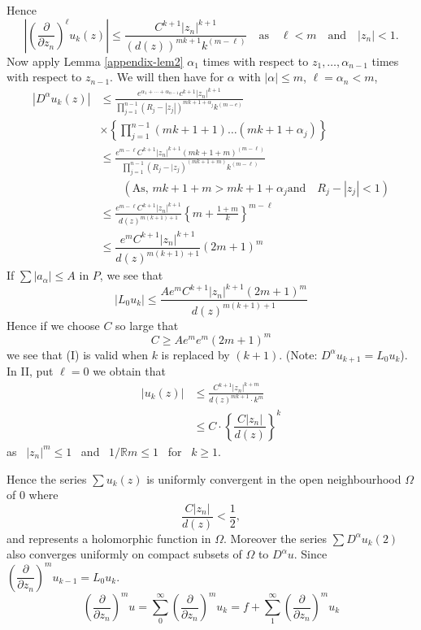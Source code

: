 Hence
$$
\left| \left(\dfrac{\partial}{\partial z_{n}}\right)^{\ell}u_{k}(z)\right|\leq \dfrac{C^{k+1}|z_{n}|^{k+1}}{(d(z))^{mk+1}k^{(m-\ell)}}\quad\text{as}\quad \ell<m\quad\text{and}\quad |z_{n}|<1.
$$
Now apply Lemma \ref{appendix-lem2} $\alpha_{1}$ times with respect to $z_{1},\ldots,\alpha_{n-1}$ times with respect to $z_{n-1}$. We will then have for $\alpha$ with $|\alpha|\leq m$, $\ell=\alpha_{n}<m$,
\begin{align*}
|D^{\alpha}u_{k}(z)| &\leq \frac{e^{\alpha_{1}+\cdots+\alpha_{n-1}}c^{k+1}|z_{n}|^{k+1}}{\prod\limits^{n-1}_{j=1}(R_{j}-|z_{j}|)^{mk+1+\alpha_{j}}k^{(m-e)}}\\[4pt]
&\times \left\{\prod\limits^{n-1}_{j=1}(mk+1+1)\ldots (mk+1+\alpha_{j})\right\}\\[4pt]
&\leq \frac{e^{m-\ell}C^{k+1}|z_{n}|^{k+1}(mk+1+m)^{(m-\ell)}}{\prod\limits^{n-1}_{j=1}(R_{j}-|z_{j})^{(mk+1+m)}k^{(m-\ell)}}\\[2pt]
&\qquad (\text{As, } mk+1+m>mk+1+\alpha_{j} \text{and~~ } R_{j}-|z_{j}|<1)\\[4pt]
&\leq \frac{e^{m-\ell}C^{k+1}|z_{n}|^{k+1}}{d(z)^{m(k+1)+1}}\left\{m+\frac{1+m}{k}\right\}^{m-\ell}\\[3pt]
&\leq \dfrac{e^{m}C^{k+1}|z_{n}|^{k+1}}{d(z)^{m(k+1)+1}}(2m+1)^{m}
\end{align*}\pageoriginale
If $\sum |a_{\alpha}|\leq A$ in $P$, we see that
$$
|L_{0}u_{k}|\leq \frac{Ae^{m}C^{k+1}|z_{n}|^{k+1}(2m+1)^{m}}{d(z)^{m(k+1)+1}}
$$
Hence if we choose $C$ so large that
$$
C\geq Ae^{m}e^{m}(2m+1)^{m}
$$
we see that (I) is valid when $k$ is replaced by $(k+1)$. (Note: $D^{\alpha}u_{k+1}=L_{0}u_{k}$). In II, put $\ell=0$ we obtain that
\begin{align*}
|u_{k}(z)| &\leq \frac{C^{k+1}|z_{n}|^{k+m}}{d(z)^{mk+1}\cdot k^{m}}\\[4pt]
&\leq C\cdot \left\{\dfrac{C|z_{n}|}{d(z)}\right\}^{k}
\end{align*}
as \ $|z_{n}|^{m}\leq 1$ \ and \ $1/\mathbb{R} m \leq 1$ \ for \ $k\geq 1$.

Hence the series $\sum u_{k}(z)$ is uniformly convergent in the open neighbourhood $\Omega$ of $0$ where
$$
\dfrac{C|z_{n}|}{d(z)}<\frac{1}{2},
$$
and represents a holomorphic function in $\Omega$. Moreover the series $\sum D^{\alpha}u_{k}(2)$ also converges uniformly on compact subsets of $\Omega$ to $D^{\alpha}u$. Since $\left(\dfrac{\partial}{\partial z_{n}}\right)^{m}u_{k-1}=L_{0}u_{k}$.
$$
\left(\frac{\partial}{\partial z_{n}}\right)^{m}u=\sum\limits^{\infty}_{0}\left(\frac{\partial}{\partial z_{n}}\right)^{m}u_{k}=f+\sum\limits^{\infty}_{1}\left(\frac{\partial}{\partial z_{n}}\right)^{m}u_{k}
$$

